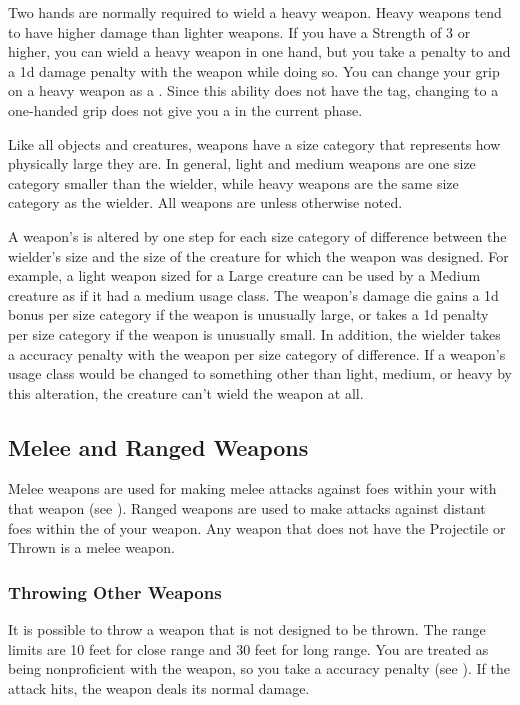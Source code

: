          Two hands are normally required to wield a heavy weapon.
        Heavy weapons tend to have higher damage than lighter weapons.
        If you have a Strength of 3 or higher, you can wield a heavy weapon in one hand, but you take a  penalty to  and a \minus1d damage penalty with the weapon while doing so.
        You can change your grip on a heavy weapon as a .
        Since this ability does not have the  tag, changing to a one-handed grip does not give you a  in the current phase.

         Like all objects and creatures, weapons have a size category that represents how physically large they are. In general, light and medium weapons are one size category smaller than the wielder, while heavy weapons are the same size category as the wielder.
        All weapons are  unless otherwise noted.

        \label{Inappropriately Sized Weapons} A weapon's  is altered by one step for each size category of difference between the wielder's size and the size of the creature for which the weapon was designed.
        For example, a light weapon sized for a Large creature can be used by a Medium creature as if it had a medium usage class.
        The weapon's damage die gains a \plus1d bonus per size category if the weapon is unusually large, or takes a \minus1d penalty per size category if the weapon is unusually small.
        In addition, the wielder takes a  accuracy penalty with the weapon per size category of difference.
        If a weapon's usage class would be changed to something other than light, medium, or heavy by this alteration, the creature can't wield the weapon at all.

    \subsection{Melee and Ranged Weapons}
        Melee weapons are used for making melee attacks against foes within your  with that weapon (see ).
        Ranged weapons are used to make attacks against distant foes within the  of your weapon.
        Any weapon that does not have the Projectile or Thrown  is a melee weapon.

            \subsubsection{Throwing Other Weapons} It is possible to throw a weapon that is not designed to be thrown.
            The range limits are 10 feet for close range and 30 feet for long range.
            You are treated as being nonproficient with the weapon, so you take a  accuracy penalty (see ).
            If the attack hits, the weapon deals its normal damage.


